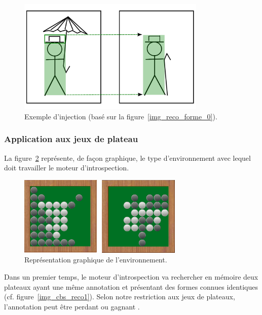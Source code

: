 \begin{figure}[H] 
\begin{center}
\includegraphics[width=0.8\textwidth]{files/raisonneur/reconnaissance_de_formes_injection} 
\end{center}
\caption{Exemple d'injection (basé sur la figure~\ref{img_reco_forme_0}).}
\label{img_reco_forme_injection}
\end{figure}

\subsubsection{Application aux jeux de plateau}
\label{subsection_introspection_jeux}


La figure~\ref{img_cbs_reco0} représente, de façon graphique, le type d'environnement avec lequel doit travailler le moteur d'introspection.

\begin{figure}[H] 
\begin{center}
\includegraphics[width=0.7\textwidth]{files/raisonneur/cbs_reco0} 
\end{center}
\caption{Représentation graphique de l'environnement.}
\label{img_cbs_reco0}
\end{figure}

Dans un premier temps, le moteur d'introspection va rechercher en mémoire deux plateaux ayant une même annotation et présentant des formes connues identiques (cf. figure~\ref{img_cbs_reco1}). Selon notre restriction aux jeux de plateaux, l'annotation peut être \og perdant \fg{} ou \og gagnant \fg{}.

